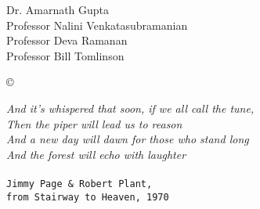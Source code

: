




\othercommitteemembers
{
  Dr. Amarnath Gupta\\
  Professor Nalini Venkatasubramanian\\
  Professor Deva Ramanan\\
  Professor Bill Tomlinson
}


\copyrightdeclaration
{
  {\copyright} {\Degreeyear} \Authorname
}


\dedications
{
  \textit{And it's whispered that soon, if we all call the tune,} \\
  \textit{Then the piper will lead us to reason} \\
  \textit{And a new day will dawn for those who stand long} \\
  \textit{And the forest will echo with laughter} \\ 
  \textit{} \\
  \setlength{\parindent}{6.3cm} \texttt{Jimmy Page \& Robert Plant, } \\
  \setlength{\parindent}{7cm} \texttt{from Stairway to Heaven, 1970} \\
}

